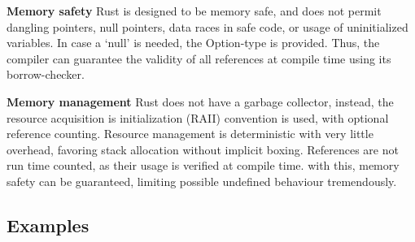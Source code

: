 \textbf{Memory safety}\label{sec:memsafe}
Rust is designed to be memory safe, and does not permit dangling pointers, null
pointers, data races in safe code, or usage of uninitialized variables. In case
a `null' is needed, the Option-type is provided. Thus, the compiler can
guarantee the validity of all references at compile time using its
borrow-checker.


\textbf{Memory management}\label{sec:memmanage}
Rust does not have a garbage collector, instead, the resource acquisition is
initialization (RAII) convention is used, with optional reference counting.
Resource management is deterministic with very little overhead, favoring stack
allocation without implicit boxing. References are not run time counted, as
their usage is verified at compile time. with this, memory safety can be
guaranteed, limiting possible undefined behaviour tremendously.



\subsection{Examples}\label{sec:examples}


